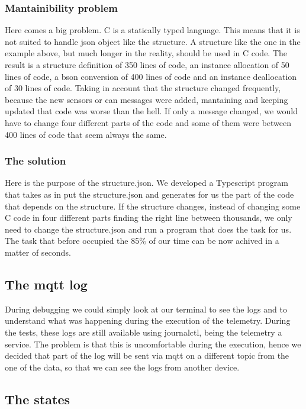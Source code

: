 \subsubsection{Mantainibility problem}

Here comes a big problem. C is a statically typed language. This means that it is not suited to handle json object like the structure. 
A structure like the one in the example above, but much longer in the reality, should be used in C code. The result is a structure deﬁnition 
of 350 lines of code, an instance allocation of 50 lines of code, a bson conversion of 400 lines of code and an instance deallocation of 30 lines
of code. Taking in account that the structure changed frequently, because the new sensors or can messages were added, mantaining and keeping 
updated that code was worse than the hell. If only a message changed, we would have to change four diﬀerent parts of the code and some of 
them were between 400 lines of code that seem always the same. 

\subsubsection{The solution}

Here is the purpose of the structure.json. We developed a Typescript program that takes as in put the structure.json and generates for us the
part of the code that depends on the structure. If the structure changes, instead of changing some C code in four different parts finding the right
line between thousands, we only need to change the structure.json and run a program that does the task for us. The task that before occupied the 85\%
of our time can be now achived in a matter of seconds.

\subsection{The mqtt log}
During debugging we could simply look at our terminal to see the logs and to understand what was happening
during the execution of the telemetry. During the tests, these logs are still available using journalctl,
being the telemetry a service. The problem is that this is uncomfortable during the execution, hence we
decided that part of the log will be sent via mqtt on a different topic from the one of the data, so that 
we can see the logs from another device.

\subsection{The states}

